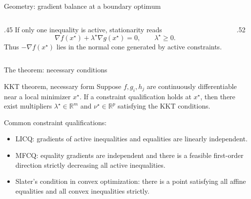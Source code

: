 \documentclass[aspectratio=169]{beamer}
\newcommand{\R}{\mathbb{R}}
\begin{document}
\begin{frame}{Geometry: gradient balance at a boundary optimum}
  \begin{columns}[T,totalwidth=\textwidth]
  \begin{column}{.45\textwidth}
    If only one inequality is active, stationarity reads
    \[
      \nabla f(x^\star)+\lambda^\star\nabla g(x^\star)=0,
      \qquad \lambda^\star\ge 0.
    \]
    Thus $-\nabla f(x^\star)$ lies in the normal cone generated by active constraints.
  \end{column}
  \begin{column}{.52\textwidth}
  \end{column}
  \end{columns}
\end{frame}

\begin{frame}{The theorem: necessary conditions}
  \begin{block}{KKT theorem, necessary form}
  Suppose $f,g_i,h_j$ are continuously differentiable near a local minimizer $x^\star$. If a constraint qualification holds at $x^\star$, then there exist multipliers $\lambda^\star\in\R^m$ and $\nu^\star\in\R^p$ satisfying the KKT conditions.
  \end{block}
  \vspace{.5em}
  Common constraint qualifications:
  \begin{itemize}
    \item LICQ: gradients of active inequalities and equalities are linearly independent.
    \item MFCQ: equality gradients are independent and there is a feasible first-order direction strictly decreasing all active inequalities.
    \item Slater's condition in convex optimization: there is a point satisfying all affine equalities and all convex inequalities strictly.
  \end{itemize}
\end{frame}
\end{document}
